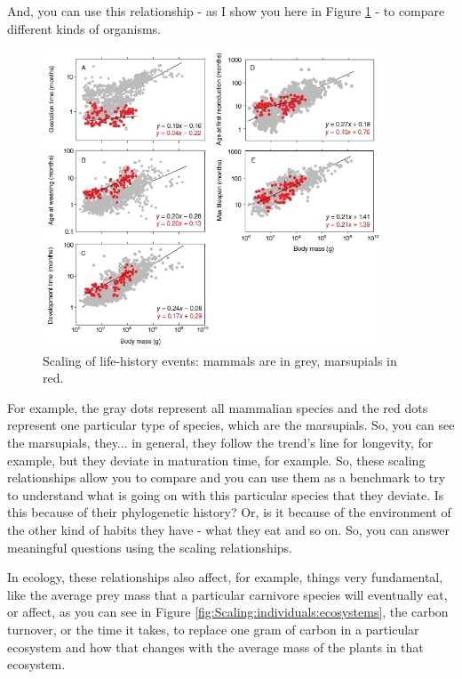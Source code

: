 \documentclass[]{article}
\begin{document}
And, you can use this relationship -
as I show you here in Figure \ref{fig:ScalingExamples} -
to compare different kinds of organisms.
\begin{figure}[H]
	\caption[Scaling of life-history events]{Scaling of life-history events: mammals are in grey, marsupials in red.\cite{sibly2012metabolic}}\label{fig:ScalingExamples}
	\includegraphics[width=0.9\textwidth]{ScalingExamples}
\end{figure}
For example, the gray dots represent
all mammalian species
and the red dots represent
one particular type of species,
which are the marsupials.
So, you can see the marsupials, they...
in general, they follow the trend's line
for longevity, for example,
but they deviate in maturation time,
for example.
So, these scaling relationships
allow you to compare
and you can use them as a benchmark
to try to understand what is going on
with this particular species
that they deviate.
Is this because of
their phylogenetic history?
Or, is it because of the environment
of the other kind of habits they have -
what they eat and so on.
So, you can answer
meaningful questions
using the scaling relationships.

In ecology,
these relationships also affect,
for example, things very fundamental,
like the average prey mass
that a particular carnivore species
will eventually eat,
or affect, as you can see in Figure \ref{fig:Scaling:individuals:ecosystems},
the carbon turnover,
or the time it takes,
to replace one gram of carbon
in a particular ecosystem
and how that changes
with the average mass of the plants
in that ecosystem.
\end{document}
